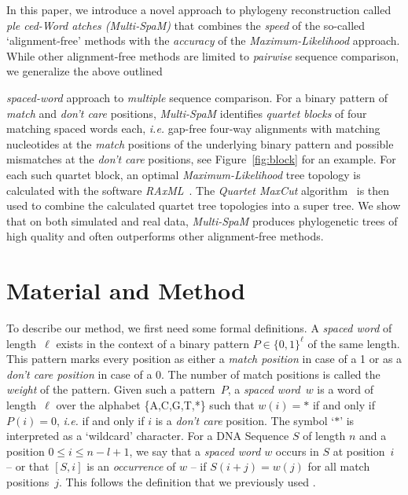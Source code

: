 \documentclass[review]{elsarticle}
\begin{document}
In this paper, we introduce a novel approach to phylogeny reconstruction called {\em \underline{}ple \underline{}ced-Word \underline{}atches (Multi-SpaM)} that combines the {\em speed} of the so-called `alignment-free' methods with the 
{\em accuracy} of the  {\em Maximum-Likelihood} approach. While other alignment-free methods are limited to {\em pairwise} sequence comparison, we generalize the above outlined {{\em spaced-word} approach to {\em multiple} sequence comparison. For a binary pattern of {\em match} and {\em don't care} positions, {\em Multi-SpaM} identifies {\em quartet blocks} of four matching spaced words each, {\em i.e.} gap-free four-way alignments with matching nucleotides at the {\em match} positions of the underlying  binary pattern and possible mismatches at the {\em don't care} positions, see Figure~\ref{fig:block} for an example. 
For each such quartet block, an optimal {\em Maximum-Likelihood} tree topology is calculated with the software {\em RAxML}~\cite{sta:14}.
The \textit{Quartet MaxCut} algorithm~\cite{sni:rao:12} is then used to combine the calculated quartet tree topologies into a super tree. 
%
We show that on both simulated and real data, {\em Multi-SpaM} produces phylogenetic trees of high quality and often outperforms other alignment-free methods.  


\section{Material and Method}

To describe our method, we first need some formal definitions. A \textit{spaced word} of length~$\ell$ exists in the context of a binary pattern $P \in \{0,1\}^\ell$ of the same length. This pattern marks every position as either a \textit{match position} in case of a 1 or as a \textit{don't care position} in case of a 0. The number of match positions is called the \textit{weight} of the pattern.
Given such a pattern~$P$, a \textit{spaced word}~$w$ is a word of length~$\ell$ over the alphabet \{A,C,G,T,*\} such that $w(i) = *$ if and only if $P(i) = 0$, {\em i.e.} if and only if $i$ is a {\em don't care} position. The symbol `$*$' is interpreted as a  `wildcard' character. 
%
For a DNA Sequence $S$ of length $n$ and a position $0 \leq i \leq n-l+1$, we say that a \textit{spaced word} $w$ occurs in $S$ at position~$i$ -- or that  $[S,i]$ is an {\em occurrence} of $w$ -- if $S(i + j) = w(j)$ for all match positions~$j$.
This follows the definition that we previously used \cite{lei:bod:hor:lin:mor:14,mor:zhu:hor:lei:15}.

}
\end{document}

